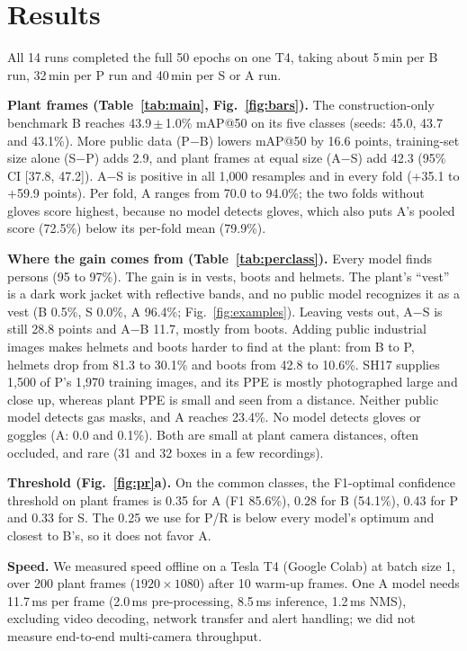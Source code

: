 \section{Results}\label{sec:results}

All 14 runs completed the full 50 epochs on one T4, taking about 5\,min per B run, 32\,min per P run and 40\,min per S or A run.

\textbf{Plant frames (Table~\ref{tab:main}, Fig.~\ref{fig:bars}).} The construction-only benchmark B reaches 43.9\,$\pm$\,1.0\% mAP@50 on its five classes (seeds: 45.0, 43.7 and 43.1\%). More public data (P$-$B) lowers mAP@50 by 16.6 points, training-set size alone (S$-$P) adds 2.9, and plant frames at equal size (A$-$S) add 42.3 (95\% CI [37.8, 47.2]). A$-$S is positive in all 1{,}000 resamples and in every fold (+35.1 to +59.9 points). Per fold, A ranges from 70.0 to 94.0\%; the two folds without gloves score highest, because no model detects gloves, which also puts A's pooled score (72.5\%) below its per-fold mean (79.9\%).

\textbf{Where the gain comes from (Table~\ref{tab:perclass}).} Every model finds persons (95 to 97\%). The gain is in vests, boots and helmets. The plant's ``vest'' is a dark work jacket with reflective bands, and no public model recognizes it as a vest (B 0.5\%, S 0.0\%, A 96.4\%; Fig.~\ref{fig:examples}). Leaving vests out, A$-$S is still 28.8 points and A$-$B 11.7, mostly from boots. Adding public industrial images makes helmets and boots harder to find at the plant: from B to P, helmets drop from 81.3 to 30.1\% and boots from 42.8 to 10.6\%. SH17 supplies 1{,}500 of P's 1{,}970 training images, and its PPE is mostly photographed large and close up, whereas plant PPE is small and seen from a distance. Neither public model detects gas masks, and A reaches 23.4\%. No model detects gloves or goggles (A: 0.0 and 0.1\%). Both are small at plant camera distances, often occluded, and rare (31 and 32 boxes in a few recordings).

\textbf{Threshold (Fig.~\ref{fig:pr}a).} On the common classes, the F1-optimal confidence threshold on plant frames is 0.35 for A (F1 85.6\%), 0.28 for B (54.1\%), 0.43 for P and 0.33 for S. The 0.25 we use for P/R is below every model's optimum and closest to B's, so it does not favor A.

\textbf{Speed.} We measured speed offline on a Tesla T4 (Google Colab) at batch size 1, over 200 plant frames ($1920\times1080$) after 10 warm-up frames. One A model needs 11.7\,ms per frame (2.0\,ms pre-processing, 8.5\,ms inference, 1.2\,ms NMS), excluding video decoding, network transfer and alert handling; we did not measure end-to-end multi-camera throughput.

